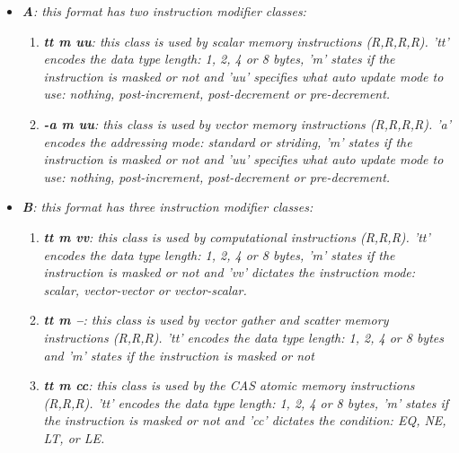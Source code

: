             \begin{itemize}

                \item \textit{\textbf{A}: this format has two instruction modifier classes:}

                    \begin{enumerate}

                        \item \textit{\textbf{tt m uu}: this class is used by scalar memory instructions (R,R,R,R). 'tt' encodes the data type length: 1, 2, 4 or 8 bytes, 'm' states if the instruction is masked or not and 'uu' specifies what auto update mode to use: nothing, post-increment, post-decrement or pre-decrement.}

                        \item \textit{\textbf{-a m uu}: this class is used by vector memory instructions (R,R,R,R). 'a' encodes the addressing mode: standard or striding, 'm' states if the instruction is masked or not and 'uu' specifies what auto update mode to use: nothing, post-increment, post-decrement or pre-decrement.}

                    \end{enumerate}

                \item \textit{\textbf{B}: this format has three instruction modifier classes:}

                    \begin{enumerate}

                        \item \textit{\textbf{tt m vv}: this class is used by computational instructions (R,R,R). 'tt' encodes the data type length: 1, 2, 4 or 8 bytes, 'm' states if the instruction is masked or not and 'vv' dictates the instruction mode: scalar, vector-vector or vector-scalar.}

                        \item \textit{\textbf{tt m --}: this class is used by vector gather and scatter memory instructions (R,R,R). 'tt' encodes the data type length: 1, 2, 4 or 8 bytes and 'm' states if the instruction is masked or not}

                        \item \textit{\textbf{tt m cc}: this class is used by the CAS atomic memory instructions (R,R,R). 'tt' encodes the data type length: 1, 2, 4 or 8 bytes, 'm' states if the instruction is masked or not and 'cc' dictates the condition: EQ, NE, LT, or LE.}


\end{enumerate}
\end{itemize}
